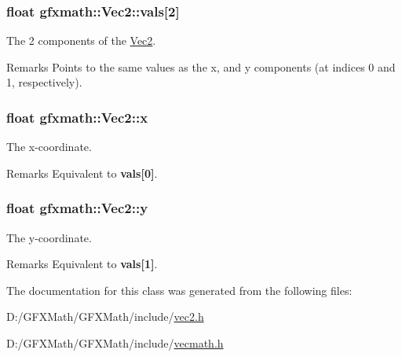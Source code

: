 \subsubsection[{vals}]{\setlength{\rightskip}{0pt plus 5cm}float gfxmath\+::\+Vec2\+::vals\mbox{[}2\mbox{]}}\label{classgfxmath_1_1_vec2_a7ea0d3fc8b8a22e4358c9dff904480ab}


The 2 components of the \hyperlink{classgfxmath_1_1_vec2}{Vec2}. 

\begin{DoxyRemark}{Remarks}
Points to the same values as the x, and y components (at indices 0 and 1, respectively). 
\end{DoxyRemark}
\hypertarget{classgfxmath_1_1_vec2_ae822579debf2a7b9aab468fbb4ce218d}{}
\subsubsection[{x}]{\setlength{\rightskip}{0pt plus 5cm}float gfxmath\+::\+Vec2\+::x}\label{classgfxmath_1_1_vec2_ae822579debf2a7b9aab468fbb4ce218d}


The x-\/coordinate. 

\begin{DoxyRemark}{Remarks}
Equivalent to {\bfseries vals\mbox{[}0\mbox{]}}. 
\end{DoxyRemark}
\hypertarget{classgfxmath_1_1_vec2_acfad5fd06cb37b0e0e5373f286e7d474}{}
\subsubsection[{y}]{\setlength{\rightskip}{0pt plus 5cm}float gfxmath\+::\+Vec2\+::y}\label{classgfxmath_1_1_vec2_acfad5fd06cb37b0e0e5373f286e7d474}


The y-\/coordinate. 

\begin{DoxyRemark}{Remarks}
Equivalent to {\bfseries vals\mbox{[}1\mbox{]}}. 
\end{DoxyRemark}


The documentation for this class was generated from the following files\+:\begin{DoxyCompactItemize}
\item 
D\+:/\+G\+F\+X\+Math/\+G\+F\+X\+Math/include/\hyperlink{vec2_8h}{vec2.\+h}\item 
D\+:/\+G\+F\+X\+Math/\+G\+F\+X\+Math/include/\hyperlink{vecmath_8h}{vecmath.\+h}\end{DoxyCompactItemize}
